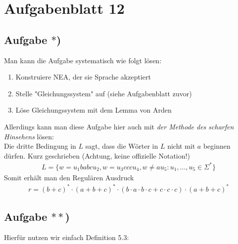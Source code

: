
\section{Aufgabenblatt 12}
\subsection*{Aufgabe $\ast$)}
Man kann die Aufgabe systematisch wie folgt lösen:
\begin{enumerate}
	\item Konstruiere NEA, der sie Sprache akzeptiert
	\item Stelle "Gleichungssystem" auf (siehe Aufgabenblatt zuvor)
	\item Löse Gleichungssystem mit dem Lemma von Arden
\end{enumerate}

Allerdings kann man diese Aufgabe hier auch mit \textit{der Methode des scharfen Hinsehens} lösen:\\
Die dritte Bedingung in $L$ sagt, dass die Wörter in $L$ nicht mit $a$ beginnen dürfen.
Kurz geschrieben (Achtung, keine offizielle Notation!)
\begin{align*}
	L=\Big\lbrace w=u_1 babc u_2,w=u_3 ccc u_4,w\neq a u_5:u_1,\ldots,u_5\in\Sigma^\ast\Big\rbrace
\end{align*}
Somit erhält man den Regulären Ausdruck 
\begin{align*}
	r=(b+c)^\ast\cdot(a+b+c)^\ast\cdot(b\cdot a\cdot b\cdot c+c\cdot c\cdot c)\cdot(a+b+c)^\ast
\end{align*}

\subsection*{Aufgabe $\ast\ast$)}
Hierfür nutzen wir einfach Definition 5.3:

